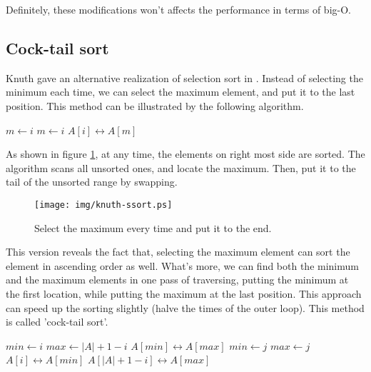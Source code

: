 \documentclass{article}
\begin{document}
Definitely, these modifications won't affects the performance in terms of big-O.

\subsection{Cock-tail sort}
Knuth gave an alternative realization of selection sort in \cite{TAOCP}. Instead of selecting the
minimum each time, we can select the maximum element, and put it to the last position. This method
can be illustrated by the following algorithm.

\begin{algorithmic}
    \State $m \gets i$
        \State $m \gets i$
      \EndIf
    \EndFor
    \State {} $A[i] \leftrightarrow A[m]$
  \EndFor
\EndProcedure
\end{algorithmic}

As shown in figure \ref{fig:knuth-ssort}, at any time, the elements on right most side
are sorted. The algorithm scans all unsorted ones, and locate the maximum. Then, put
it to the tail of the unsorted range by swapping.

\begin{figure}[htbp]
  \centering
  \texttt{[image: img/knuth-ssort.ps]}
  \caption{Select the maximum every time and put it to the end.}
  \label{fig:knuth-ssort}
\end{figure}

This version reveals the fact that, selecting the maximum element can sort the element in
ascending order as well. What's more, we can find both the minimum and the maximum elements
in one pass of traversing, putting the minimum at the first location, while putting the
maximum at the last position. This approach can speed up the sorting slightly (halve the
times of the outer loop). This method is called 'cock-tail sort'.

\begin{algorithmic}
    \State $min \gets i$
    \State $max \gets |A| + 1 - i$
      \State {} $A[min] \leftrightarrow A[max]$
    \EndIf
        \State $min \gets j$
      \EndIf
        \State $max \gets j$
      \EndIf
    \EndFor
    \State {} $A[i] \leftrightarrow A[min]$
    \State {} $A[|A|+1-i] \leftrightarrow A[max]$
  \EndFor
\EndProcedure
\end{algorithmic}
\end{document}
